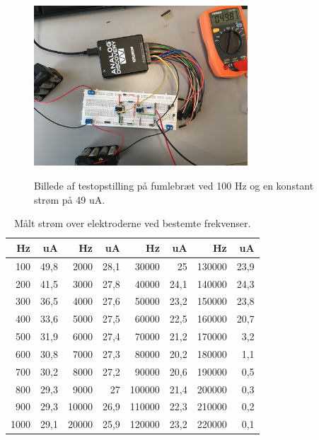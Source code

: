 \begin{figure}[H]
\centering
{\includegraphics[width=8cm]
{Figure/oprindeligekredslobfumle1}}
\caption{Billede af testopstilling på fumlebræt ved 100 Hz og en konstant strøm på 49 uA.}
\label{fig:oprindeligekredslobfumle1}
\end{figure}





\begin{table}[H]
\centering
\begin{tabular}{| r | r || r | r || r | r || r | r |}
    \hline
    \textbf{Hz} & \textbf{uA} & \textbf{Hz} & \textbf{uA} & \textbf{Hz} & \textbf{uA} & \textbf{Hz} & \textbf{uA}\\ \hline
    100 & 49,8 & 2000 & 28,1 & 30000 & 25 & 130000 & 23,9  \\ \hline
    200 & 41,5 & 3000 & 27,8 & 40000 & 24,1 & 140000 & 24,3  \\ \hline
    300 & 36,5 & 4000 & 27,6 & 50000 & 23,2 & 150000 & 23,8  \\ \hline
    400 & 33,6 & 5000 & 27,5 & 60000 & 22,5 & 160000 & 20,7  \\ \hline
    500 & 31,9 & 6000 & 27,4 & 70000 & 21,2 & 170000 & 3,2  \\ \hline
    600 & 30,8 & 7000 & 27,3 & 80000 & 20,2 & 180000 & 1,1  \\ \hline
    700 & 30,2 & 8000 & 27,2 & 90000 & 20,6 & 190000 & 0,5  \\ \hline
    800 & 29,3 & 9000 & 27 & 100000 & 21,4 &  200000 & 0,3  \\ \hline
    900 & 29,3 & 10000 & 26,9 & 110000 & 22,3 &  210000 & 0,2   \\ \hline
    1000 & 29,1 & 20000 & 25,9 & 120000 & 23,2 &  220000 & 0,1  \\ \hline
\end{tabular}
    \caption{Målt strøm over elektroderne ved bestemte frekvenser.}
    \label{table:frekvensernoload2}
\end{table} 



